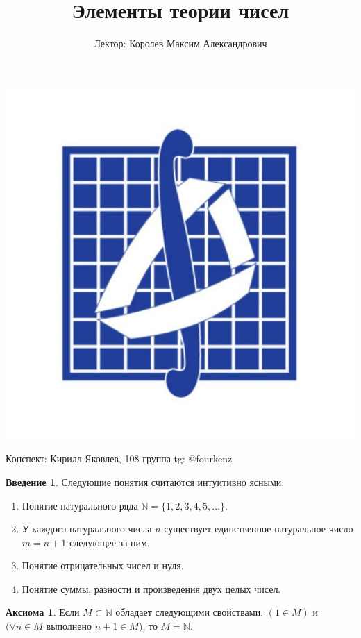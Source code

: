 \documentclass[a4paper, 12pt]{article}
\title{\textbf{Элементы теории чисел}}
\author{Лектор: Королев Максим Александрович}
\newcommand\tab[1][.5cm]{\hspace*{#1}}
\theoremstyle{definition}
\newtheorem*{axiom}{Аксиома}
\newtheorem*{introduction}{Введение}
\begin{document}
    \fontsize{14pt}{20pt}\selectfont
    \maketitle
    \vspace{1cm}
    \begin{center}
        \includegraphics[width=0.8\linewidth]{mehmat.png}
    \end{center}
    \vspace{1.5cm}
    \begin{center}
        Конспект: Кирилл Яковлев, 108 группа \tab[5.5cm] tg: @fourkenz
    \end{center}
    \newpage
    \tableofcontents
    \fontsize{14pt}{20pt}\selectfont
    \newpage
    \begin{introduction}
        Следующие понятия считаются интуитивно ясными:
    \end{introduction}
    \begin{enumerate}
        \item Понятие натурального ряда $\mathbb{N} = \{1, 2, 3, 4, 5, \dots\}$.
        \item У каждого натурального числа $n$ существует единственное натуральное число $m=n+1$ следующее за ним. 
        \item Понятие отрицательных чисел и нуля.
        \item Понятие суммы, разности и произведения двух целых чисел.
    \end{enumerate}
    \begin{axiom}
        Если $M \subset \mathbb{N}$ обладает следующими свойствами: $(1 \in M)$ и $(\forall n\in M$ выполнено $n+1 \in M)$, то $M = \mathbb{N}$.
    \end{axiom}
\end{document}
